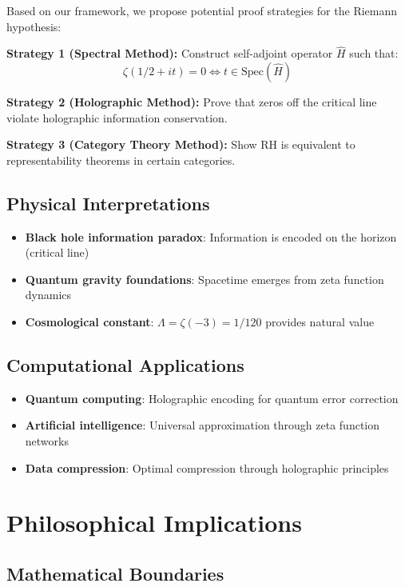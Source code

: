 \documentclass[12pt]{article}
\begin{document}
Based on our framework, we propose potential proof strategies for the Riemann hypothesis:

\textbf{Strategy 1 (Spectral Method):} Construct self-adjoint operator $\hat{H}$ such that:
$$\zeta(1/2 + it) = 0 \Leftrightarrow t \in \text{Spec}(\hat{H})$$

\textbf{Strategy 2 (Holographic Method):} Prove that zeros off the critical line violate holographic information conservation.

\textbf{Strategy 3 (Category Theory Method):} Show RH is equivalent to representability theorems in certain categories.

\subsection{Physical Interpretations}

\begin{itemize}
\item \textbf{Black hole information paradox}: Information is encoded on the horizon (critical line)
\item \textbf{Quantum gravity foundations}: Spacetime emerges from zeta function dynamics
\item \textbf{Cosmological constant}: $\Lambda = \zeta(-3) = 1/120$ provides natural value
\end{itemize}

\subsection{Computational Applications}

\begin{itemize}
\item \textbf{Quantum computing}: Holographic encoding for quantum error correction
\item \textbf{Artificial intelligence}: Universal approximation through zeta function networks
\item \textbf{Data compression}: Optimal compression through holographic principles
\end{itemize}

\section{Philosophical Implications}

\subsection{Mathematical Boundaries}
\end{document}
